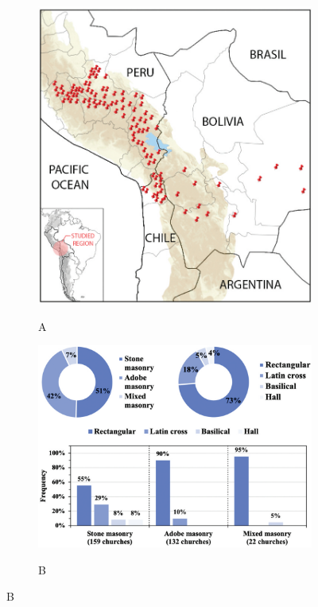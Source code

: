 \begin{figure}[ht]
  \caption{Figura con subfiguras}
  \label{fig:figura}
  \begin{subfigure}{0.35\textwidth}
      \centering
      \caption{A}
      \includegraphics[scale=0.28]{F_Figures/11_Chapter II/Cap2_Imagen2a.png}
      \label{fig:subfig1}
  \end{subfigure}
  \hfill
  \begin{subfigure}{0.55\textwidth}
      \centering
      \caption{B}
      \includegraphics[scale=0.28]{F_Figures/11_Chapter II/Cap2_Imagen2b.png}
      \label{fig:subfig2}
  \end{subfigure}
\end{figure}

